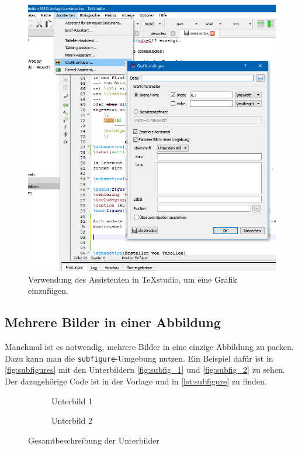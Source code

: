 \begin{figure}
\centering
\includegraphics[width=0.7\linewidth]{bilder/GrafikEinfuegen}
\caption{Verwendung des Assistenten in \TeX studio, um eine Grafik einzufügen.}
\label{fig:GrafikEinfuegen}
\end{figure}

\subsection{Mehrere Bilder in einer Abbildung}

Manchmal ist es notwendig, mehrere Bilder in eine einzige Abbildung zu packen. Dazu kann man die \lstinline|subfigure|-Umgebung nutzen. Ein Beispiel dafür ist in \autoref{fig:subfigures} mit den Unterbildern \autoref{fig:subfig_1} und \autoref{fig:subfig_2} zu sehen. Der dazugehörige Code ist in der Vorlage und in \autoref{lst:subfigure} zu finden.

\begin{figure}
    \centering
    \begin{subfigure}{0.45\textwidth}
        \centering
        \caption{Unterbild 1}
        \label{fig:subfig_1}
    \end{subfigure}
    \hfill
    \begin{subfigure}{0.45\textwidth}
        \centering
        \caption{Unterbild 2}
        \label{fig:subfig_2}
    \end{subfigure}
    \caption{Gesamtbeschreibung der Unterbilder}
    \label{fig:subfigures}
\end{figure}

